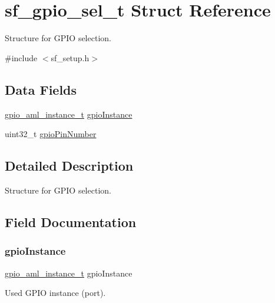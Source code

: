 \hypertarget{structsf__gpio__sel__t}{}\section{sf\+\_\+gpio\+\_\+sel\+\_\+t Struct Reference}
\label{structsf__gpio__sel__t}


Structure for G\+P\+IO selection.  




{\ttfamily \#include $<$sf\+\_\+setup.\+h$>$}

\subsection*{Data Fields}
\begin{DoxyCompactItemize}
\item 
\mbox{\hyperlink{group__enum__group_ga325a66c5aefcf2c26cd0234c7e4bb0ef}{gpio\+\_\+aml\+\_\+instance\+\_\+t}} \mbox{\hyperlink{structsf__gpio__sel__t_a92ec1b839cc60a854da420c83ba78aa1}{gpio\+Instance}}
\item 
uint32\+\_\+t \mbox{\hyperlink{structsf__gpio__sel__t_a6ab60439fc8e4e0575afdd2cf2bb9670}{gpio\+Pin\+Number}}
\end{DoxyCompactItemize}


\subsection{Detailed Description}
Structure for G\+P\+IO selection. 

\subsection{Field Documentation}
\mbox{\label{structsf__gpio__sel__t_a92ec1b839cc60a854da420c83ba78aa1}} 
\subsubsection{\texorpdfstring{gpioInstance}{gpioInstance}}
{\footnotesize\ttfamily \mbox{\hyperlink{group__enum__group_ga325a66c5aefcf2c26cd0234c7e4bb0ef}{gpio\+\_\+aml\+\_\+instance\+\_\+t}} gpio\+Instance}

Used G\+P\+IO instance (port). \mbox{\label{structsf__gpio__sel__t_a6ab60439fc8e4e0575afdd2cf2bb9670}} 
